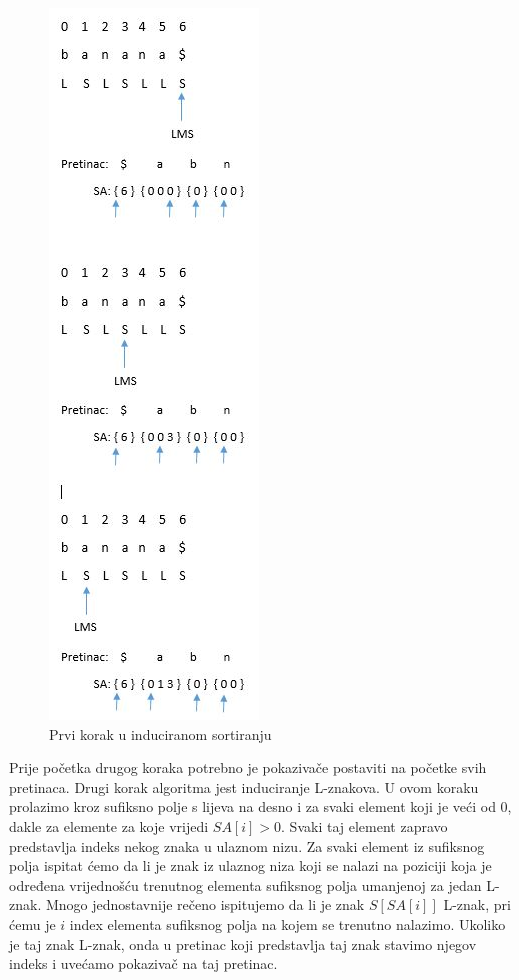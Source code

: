 \begin{figure}[H]
   \centering
       \includegraphics{./pictures/SAISstep1.jpg}
 \caption{Prvi korak u induciranom sortiranju}
 \label{fig:sais1}
\end{figure}

Prije početka drugog koraka potrebno je pokazivače postaviti na početke svih pretinaca. Drugi korak algoritma jest induciranje L-znakova. U ovom koraku prolazimo kroz sufiksno polje s lijeva na desno i za svaki element koji je veći od 0, dakle za elemente za koje vrijedi $SA[i]>0$. Svaki taj  element zapravo predstavlja indeks nekog znaka u ulaznom nizu. Za svaki element iz sufiksnog polja ispitat ćemo da li je znak iz ulaznog niza koji se nalazi na poziciji koja je određena vrijednošću trenutnog elementa sufiksnog polja umanjenoj za jedan L-znak. Mnogo jednostavnije rečeno  ispitujemo da li je znak $S[SA[i]]$ L-znak, pri ćemu je $i$ index elementa sufiksnog polja na kojem se trenutno nalazimo. Ukoliko je taj znak L-znak, onda u pretinac koji predstavlja taj znak stavimo njegov indeks i uvećamo pokazivač na taj pretinac. 

